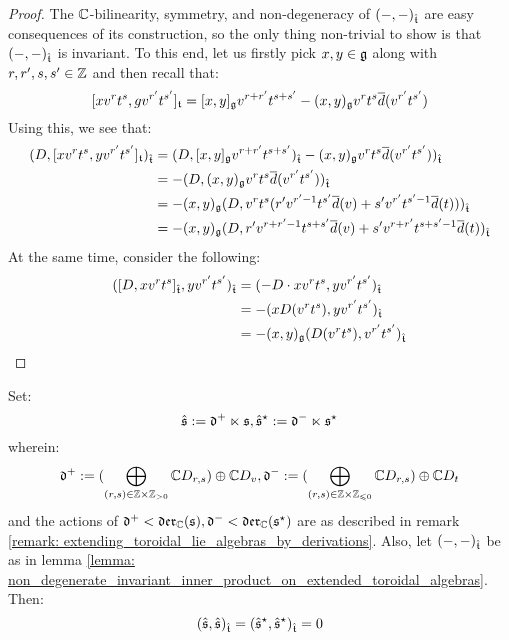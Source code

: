             \begin{proof}
                The $\mathbb{C}$-bilinearity, symmetry, and non-degeneracy of $(-, -)_{\hat{\mathfrak{t}}}$ are easy consequences of its construction, so the only thing non-trivial to show is that $(-, -)_{\hat{\mathfrak{t}}}$ is invariant. To this end, let us firstly pick $x, y \in \mathfrak{g}$ along with $r, r', s, s' \in \mathbb{Z}$ and then recall that:
                    $$[x v^r t^s, g v^{r'} t^{s'}]_{\mathfrak{t}} = [x, y]_{\mathfrak{g}} v^{r + r'} t^{s + s'} - (x, y)_{\mathfrak{g}} v^r t^s \overline{d}(v^{r'} t^{s'})$$
                Using this, we see that:
                    $$
                        \begin{aligned}
                            ( D, [x v^r t^s, y v^{r'} t^{s'}]_{\mathfrak{t}} )_{\hat{\mathfrak{t}}} & = ( D, [x, y]_{\mathfrak{g}} v^{r + r'} t^{s + s'} )_{\hat{\mathfrak{t}}} - (x, y)_{\mathfrak{g}} v^r t^s \overline{d}( v^{r'} t^{s'}) )_{\hat{\mathfrak{t}}}
                            \\
                            & = -( D, (x, y)_{\mathfrak{g}} v^r t^s \overline{d}( v^{r'} t^{s'}) )_{\hat{\mathfrak{t}}}
                            \\
                            & = -(x, y)_{\mathfrak{g}} ( D, v^r t^s ( r' v^{r' - 1} t^{s'} \overline{d}(v) + s' v^{r'} t^{s' - 1} \overline{d}(t) ) )_{\hat{\mathfrak{t}}} 
                            \\
                            & = -(x, y)_{\mathfrak{g}} ( D, r' v^{r + r' - 1} t^{s + s'} \overline{d}(v) + s' v^{r + r'} t^{s + s' - 1} \overline{d}(t) )_{\hat{\mathfrak{t}}}
                        \end{aligned}
                    $$
                At the same time, consider the following:
                    $$
                        \begin{aligned}
                            ( [D, x v^r t^s]_{\hat{\mathfrak{t}}}, y v^{r'} t^{s'} )_{\hat{\mathfrak{t}}} & = ( -D \cdot x v^r t^s, y v^{r'} t^{s'} )_{\hat{\mathfrak{t}}}
                            \\
                            & = -( x D( v^r t^s ), y v^{r'} t^{s'} )_{\hat{\mathfrak{t}}}
                            \\
                            & = -(x, y)_{\mathfrak{g}} ( D( v^r t^s ), v^{r'} t^{s'} )_{\hat{\mathfrak{t}}}
                        \end{aligned}
                    $$
            \end{proof}
        \begin{proposition}
            Set:
                $$\hat{\mathfrak{s}} := \mathfrak{d}^+ \ltimes \mathfrak{s}, \hat{\mathfrak{s}}^{\star} := \mathfrak{d}^- \ltimes \mathfrak{s}^{\star}$$
            wherein:
                $$\d^+ := ( \bigoplus_{(r, s) \in \Z \x \Z_{> 0}} \bbC D_{r, s} ) \oplus \bbC D_v, \d^- := ( \bigoplus_{(r, s) \in \Z \x \Z_{\leq 0}} \bbC D_{r, s} ) \oplus \bbC D_t$$
            and the actions of $\mathfrak{d}^+ < \mathfrak{der}_{\mathbb{C}}(\mathfrak{s}), \mathfrak{d}^- < \mathfrak{der}_{\mathbb{C}}(\mathfrak{s}^{\star})$ are as described in remark \ref{remark: extending_toroidal_lie_algebras_by_derivations}. Also, let $(-, -)_{\hat{\mathfrak{t}}}$ be as in lemma \ref{lemma: non_degenerate_invariant_inner_product_on_extended_toroidal_algebras}. Then:
                $$(\hat{\mathfrak{s}}, \hat{\mathfrak{s}})_{\hat{\mathfrak{t}}} = (\hat{\mathfrak{s}}^{\star}, \hat{\mathfrak{s}}^{\star})_{\hat{\mathfrak{t}}} = 0$$
        \end{proposition}
